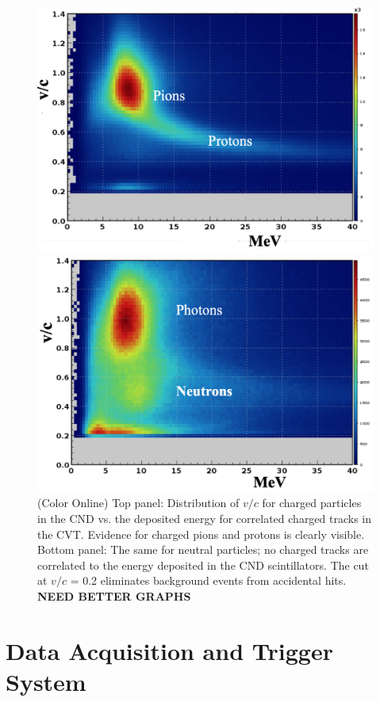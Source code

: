 \documentclass[final,3p,twocolumn]{elsarticle}
\begin{document}
\begin{figure}[htbp!]
\centerline{\includegraphics[width=0.9\columnwidth]{CND1.png}}
\centerline{\includegraphics[width=0.9\columnwidth]{CND2.png}}
\caption{(Color Online) Top panel: Distribution of $v/c$ for charged particles in the CND vs. the deposited energy for correlated
charged tracks in the CVT. Evidence for charged pions and protons is clearly visible.  Bottom panel: The same for
neutral particles; no charged tracks are correlated to the energy deposited in the CND scintillators. The cut at
$v/c$ = 0.2 eliminates background events from accidental hits. {\bf NEED BETTER GRAPHS}} 
\label{CND-neutrals}
\end{figure} 

\section{Data Acquisition and Trigger System} 
\end{document}
